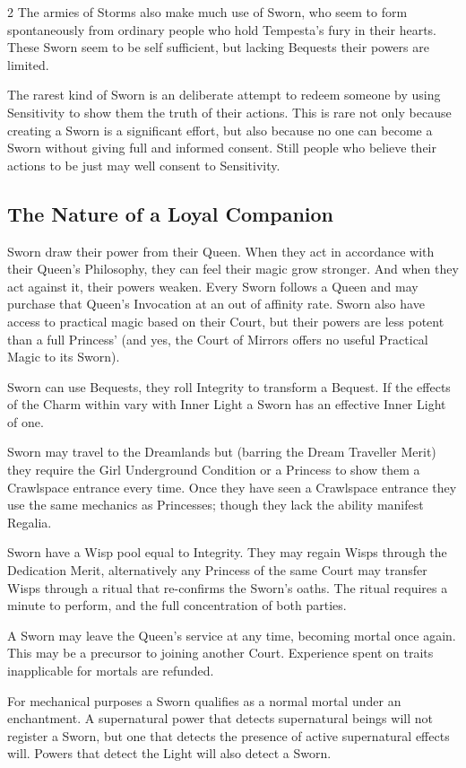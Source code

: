 \begin{multicols}{2}
The armies of Storms also make much use of Sworn, who seem to form spontaneously from ordinary people who hold Tempesta’s fury in their hearts. These Sworn seem to be self sufficient, but lacking Bequests their powers are limited.

The rarest kind of Sworn is an deliberate attempt to redeem someone by using Sensitivity to show them  the truth of their actions. This is rare not only because creating a Sworn is a significant effort, but also because no one can become a Sworn without giving full and informed consent. Still people who believe their actions to be just may well consent to Sensitivity.

\subsection*{The Nature of a Loyal Companion}

Sworn draw their power from their Queen. When they act in accordance with their Queen's Philosophy, they can feel their magic grow stronger. And when they act against it, their powers weaken. Every Sworn follows a Queen and may purchase that Queen's Invocation at an out of affinity rate. Sworn also have access to practical magic based on their Court, but their powers are less potent than a full Princess' (and yes, the Court of Mirrors offers no useful Practical Magic to its Sworn).

Sworn can use Bequests, they roll Integrity to transform a Bequest. If the effects of the Charm within vary with Inner Light a Sworn has an effective Inner Light of one. 

Sworn may travel to the Dreamlands but (barring the Dream Traveller Merit) they require the Girl Underground Condition or a Princess to show them a Crawlspace entrance every time. Once they have seen a Crawlspace entrance they use the same mechanics as Princesses; though they lack the ability manifest Regalia. 

Sworn have a Wisp pool equal to Integrity. They may regain Wisps through the Dedication Merit, alternatively any Princess of the same Court may transfer Wisps through a ritual that re-confirms the Sworn's oaths. The ritual requires a minute to perform, and the full concentration of both parties.

A Sworn may leave the Queen's service at any time, becoming mortal once again. This may be a precursor to joining another Court. Experience spent on traits inapplicable for mortals are refunded.

For mechanical purposes a Sworn qualifies as a normal mortal under an enchantment. A supernatural power that detects supernatural beings will not register a Sworn, but one that detects the presence of active supernatural effects will. Powers that detect the Light will also detect a Sworn. 


\end{multicols}

